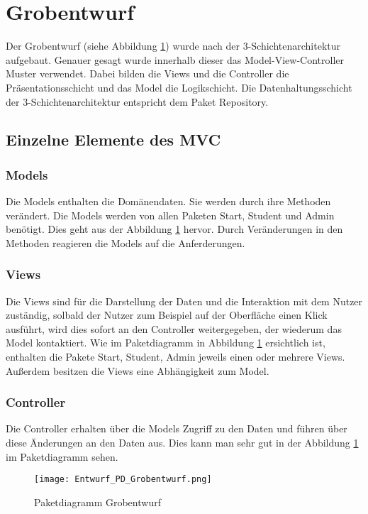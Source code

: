 \documentclass[a4paper,10pt]{article}
\begin{document}
\section{Grobentwurf}
Der Grobentwurf (siehe Abbildung \ref{fig:Paketdiagramm_Grobentwurf}) wurde nach der 3-Schichtenarchitektur aufgebaut. Genauer gesagt wurde innerhalb dieser das Model-View-Controller Muster verwendet. 
Dabei bilden die Views und die Controller die Präsentationsschicht und das Model die Logikschicht. Die Datenhaltungsschicht der 3-Schichtenarchitektur entspricht dem Paket Repository.

\subsection{Einzelne Elemente des MVC}
  \subsubsection{Models} 
    Die Models enthalten die Domänendaten. Sie werden durch ihre Methoden verändert. Die Models werden von allen Paketen Start, Student und Admin ben\"otigt. Dies geht aus der Abbildung \ref{fig:Paketdiagramm_Grobentwurf} hervor.
    Durch Ver\"anderungen in den Methoden reagieren die Models auf die Anferderungen.
   \subsubsection{Views}
   Die Views sind für die Darstellung der Daten und die Interaktion mit dem Nutzer zuständig, solbald der Nutzer zum Beispiel auf der Oberfläche einen Klick ausführt, wird dies sofort an den Controller weitergegeben, der wiederum das Model kontaktiert.
   Wie im Paketdiagramm in  Abbildung \ref{fig:Paketdiagramm_Grobentwurf} ersichtlich ist, enthalten die Pakete Start, Student, Admin jeweils einen oder mehrere Views.
   Au\ss{}erdem besitzen die Views eine Abh\"angigkeit zum Model.
   \subsubsection{Controller}
   Die Controller erhalten über die Models Zugriff zu den Daten und führen über diese Änderungen an den Daten aus. Dies kann man sehr gut in der Abbildung \ref{fig:Paketdiagramm_Grobentwurf} im Paketdiagramm sehen.
   
   \begin{figure}
    \texttt{[image: Entwurf\_PD\_Grobentwurf.png]}
    \label{fig:Paketdiagramm_Grobentwurf}
    \caption{Paketdiagramm Grobentwurf}
   \end{figure} 
\end{document}
